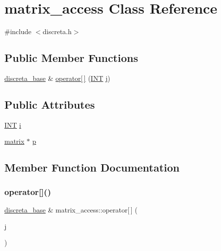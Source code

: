 \hypertarget{classmatrix__access}{}\section{matrix\+\_\+access Class Reference}
\label{classmatrix__access}


{\ttfamily \#include $<$discreta.\+h$>$}

\subsection*{Public Member Functions}
\begin{DoxyCompactItemize}
\item 
\mbox{\hyperlink{classdiscreta__base}{discreta\+\_\+base}} \& \mbox{\hyperlink{classmatrix__access_aaacf72bfd47b935c415c9d55734aab19}{operator\mbox{[}$\,$\mbox{]}}} (\mbox{\hyperlink{galois_8h_a09fddde158a3a20bd2dcadb609de11dc}{I\+NT}} \mbox{\hyperlink{alphabet2_8_c_a37d972ae0b47b9099e30983131d31916}{j}})
\end{DoxyCompactItemize}
\subsection*{Public Attributes}
\begin{DoxyCompactItemize}
\item 
\mbox{\hyperlink{galois_8h_a09fddde158a3a20bd2dcadb609de11dc}{I\+NT}} \mbox{\hyperlink{classmatrix__access_a3eb84d20310a5ebd7e7fe53816b5d14c}{i}}
\item 
\mbox{\hyperlink{classmatrix}{matrix}} $\ast$ \mbox{\hyperlink{classmatrix__access_ae387e0cbf6aa984184f7371fec183024}{p}}
\end{DoxyCompactItemize}


\subsection{Member Function Documentation}
\mbox{\label{classmatrix__access_aaacf72bfd47b935c415c9d55734aab19}} 
\subsubsection{\texorpdfstring{operator[]()}{operator[]()}}
{\footnotesize\ttfamily \mbox{\hyperlink{classdiscreta__base}{discreta\+\_\+base}} \& matrix\+\_\+access\+::operator\mbox{[}$\,$\mbox{]} (\begin{DoxyParamCaption}\item[{\mbox{\hyperlink{galois_8h_a09fddde158a3a20bd2dcadb609de11dc}{I\+NT}}}]{j }\end{DoxyParamCaption})}



